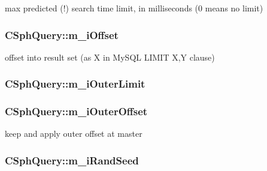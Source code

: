 max predicted (!) search time limit, in milliseconds (0 means no limit) 

\hypertarget{classCSphQuery_a6db8997e8178e6a3e6e8f07dcb326d00}{
\subsubsection[{m\-\_\-i\-Offset}]{ C\-Sph\-Query\-::m\-\_\-i\-Offset}}\label{classCSphQuery_a6db8997e8178e6a3e6e8f07dcb326d00}


offset into result set (as X in My\-S\-Q\-L L\-I\-M\-I\-T X,Y clause) 

\hypertarget{classCSphQuery_a144ed2a1aa4ff60fb8f1d3f2a8f42741}{
\subsubsection[{m\-\_\-i\-Outer\-Limit}]{ C\-Sph\-Query\-::m\-\_\-i\-Outer\-Limit}}\label{classCSphQuery_a144ed2a1aa4ff60fb8f1d3f2a8f42741}
\hypertarget{classCSphQuery_a92854a548ba9feba57791dec1f64c80b}{
\subsubsection[{m\-\_\-i\-Outer\-Offset}]{ C\-Sph\-Query\-::m\-\_\-i\-Outer\-Offset}}\label{classCSphQuery_a92854a548ba9feba57791dec1f64c80b}


keep and apply outer offset at master 

\hypertarget{classCSphQuery_a20f54c618276daa5d4f3b8df8fb14e61}{
\subsubsection[{m\-\_\-i\-Rand\-Seed}]{ C\-Sph\-Query\-::m\-\_\-i\-Rand\-Seed}}\label{classCSphQuery_a20f54c618276daa5d4f3b8df8fb14e61}


